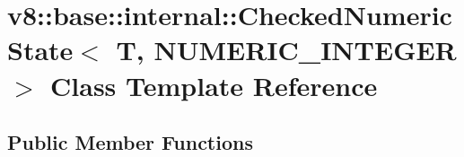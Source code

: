 \hypertarget{classv8_1_1base_1_1internal_1_1_checked_numeric_state_3_01_t_00_01_n_u_m_e_r_i_c___i_n_t_e_g_e_r_01_4}{}\section{v8\+:\+:base\+:\+:internal\+:\+:Checked\+Numeric\+State$<$ T, N\+U\+M\+E\+R\+I\+C\+\_\+\+I\+N\+T\+E\+G\+ER $>$ Class Template Reference}
\label{classv8_1_1base_1_1internal_1_1_checked_numeric_state_3_01_t_00_01_n_u_m_e_r_i_c___i_n_t_e_g_e_r_01_4}
\subsection*{Public Member Functions}
